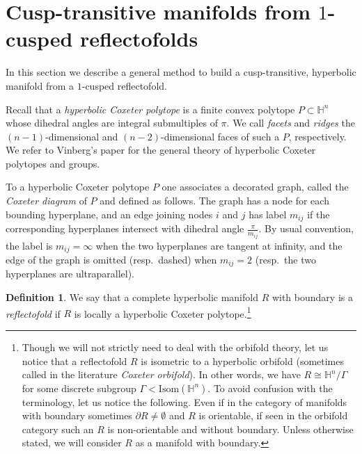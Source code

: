 \documentclass{amsart}
\theoremstyle{definition}
\newtheorem{defn}[lemma]{Definition}
\newtheorem{quest}[lemma]{Question}
\theoremstyle{remark}
\newcommand{\matH} {\ensuremath {\mathbb{H}}}
\newcommand{\Isom}{\ensuremath {\mathrm{Isom}}}
\begin{document}
%
%
%

\section{Cusp-transitive manifolds from \texorpdfstring{$1$}{1}-cusped reflectofolds} \label{section2}

In this section we describe a general method to build a cusp-transitive, hyperbolic manifold from a $1$-cusped reflectofold.

Recall that a \emph{hyperbolic Coxeter polytope} is a finite convex polytope $P \subset \matH^n$ whose dihedral angles are integral submultiples of $\pi$. We call \emph{facets} and \emph{ridges} the $(n-1)$-dimensional and $(n-2)$-dimensional faces of such a $P$, respectively. We refer to Vinberg's paper \cite{V} for the general theory of hyperbolic Coxeter polytopes and groups.

To a hyperbolic Coxeter polytope $P$ one associates a decorated graph, called the \emph{Coxeter diagram} of $P$ and defined as follows. The graph has a node for each bounding hyperplane, and an edge joining nodes $i$ and $j$ has label $m_{ij}$ if the corresponding hyperplanes intersect with dihedral angle $\frac{\pi}{m_{ij}}$. By usual convention, the label is $m_{ij} = \infty$ when the two hyperplanes are tangent at infinity, and the edge of the graph is omitted (resp.~dashed) when $m_{ij}=2$ (resp.~the two hyperplanes are ultraparallel). 

\begin{defn}
    We say that a complete hyperbolic manifold $R$ with boundary is a \emph{reflectofold} if $R$ is locally a hyperbolic Coxeter polytope.\footnote{Though we will not strictly need to deal with the orbifold theory, let us notice that a reflectofold $R$ is isometric to a hyperbolic orbifold (sometimes called in the literature \emph{Coxeter orbifold}). In other words, we have $R \cong \matH^n/\Gamma$ for some discrete subgroup $\Gamma < \Isom(\matH^n)$. To avoid confusion with the terminology, let us notice the following.
    Even if in the category of manifolds with boundary sometimes $\partial R \neq \emptyset$ and $R$ is orientable, if seen in the orbifold category such an $R$ is non-orientable and without boundary. Unless otherwise stated, we will consider $R$ as a manifold with boundary.}    
\end{defn}
\end{document}

